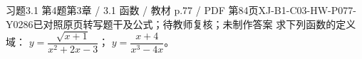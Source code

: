 \par\noindent\begin{minipage}{\linewidth}
\begin{bankitem}{习题3.1 第4题}{第3章 / 3.1 函数 / 教材 p.77 / PDF 第84页}{XJ-B1-C03-HW-P077-Y0286}{已对照原页转写题干及公式；待教师复核；未制作答案}
求下列函数的定义域：
$y=\dfrac{\sqrt{x+1}}{x^2+2x-3}$；
$y=\dfrac{x+4}{x^3-4x}$。
\end{bankitem}
\end{minipage}\par\medskip
